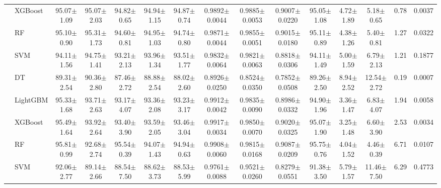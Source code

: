 \begin{tabular}{@{}llccccccccccccc@{}}
 & XGBoost & 95.07{\tiny$\pm$1.09} & 95.07{\tiny$\pm$2.03} & 94.82{\tiny$\pm$0.65} & 94.94{\tiny$\pm$1.15} & 94.87{\tiny$\pm$0.74} & 0.9892{\tiny$\pm$0.0044} & 0.9885{\tiny$\pm$0.0053} & 0.9007{\tiny$\pm$0.0220} & 95.05{\tiny$\pm$1.08} & 4.72{\tiny$\pm$1.89} & 5.18{\tiny$\pm$0.65} & 0.78 & 0.0037\\
 & RF & 95.10{\tiny$\pm$0.90} & 95.31{\tiny$\pm$1.73} & 94.60{\tiny$\pm$0.81} & 94.95{\tiny$\pm$1.03} & 94.74{\tiny$\pm$0.80} & 0.9871{\tiny$\pm$0.0044} & 0.9855{\tiny$\pm$0.0051} & 0.9015{\tiny$\pm$0.0180} & 95.11{\tiny$\pm$0.89} & 4.38{\tiny$\pm$1.26} & 5.40{\tiny$\pm$0.81} & 1.27 & 0.0322\\
 & SVM & 94.11{\tiny$\pm$1.56} & 94.75{\tiny$\pm$1.41} & 93.21{\tiny$\pm$2.13} & 93.96{\tiny$\pm$1.34} & 93.51{\tiny$\pm$1.77} & 0.9832{\tiny$\pm$0.0064} & 0.9821{\tiny$\pm$0.0063} & 0.8818{\tiny$\pm$0.0306} & 94.11{\tiny$\pm$1.49} & 5.00{\tiny$\pm$1.59} & 6.79{\tiny$\pm$2.13} & 1.21 & 0.1877\\
 & DT & 89.31{\tiny$\pm$2.54} & 90.36{\tiny$\pm$2.80} & 87.46{\tiny$\pm$2.72} & 88.88{\tiny$\pm$2.54} & 88.02{\tiny$\pm$2.60} & 0.8926{\tiny$\pm$0.0250} & 0.8524{\tiny$\pm$0.0350} & 0.7852{\tiny$\pm$0.0508} & 89.26{\tiny$\pm$2.50} & 8.94{\tiny$\pm$2.52} & 12.54{\tiny$\pm$2.72} & 0.19 & 0.0007\\
\midrule
{} & LightGBM & 95.33{\tiny$\pm$1.68} & 93.71{\tiny$\pm$2.63} & 93.17{\tiny$\pm$4.07} & 93.36{\tiny$\pm$2.08} & 93.23{\tiny$\pm$3.17} & 0.9912{\tiny$\pm$0.0042} & 0.9835{\tiny$\pm$0.0090} & 0.8986{\tiny$\pm$0.0332} & 94.90{\tiny$\pm$1.96} & 3.36{\tiny$\pm$1.47} & 6.83{\tiny$\pm$4.07} & 1.94 & 0.0058\\
 & XGBoost & 95.49{\tiny$\pm$1.64} & 93.92{\tiny$\pm$2.64} & 93.40{\tiny$\pm$3.90} & 93.59{\tiny$\pm$2.05} & 93.46{\tiny$\pm$3.04} & 0.9917{\tiny$\pm$0.0034} & 0.9850{\tiny$\pm$0.0070} & 0.9020{\tiny$\pm$0.0325} & 95.07{\tiny$\pm$1.90} & 3.25{\tiny$\pm$1.48} & 6.60{\tiny$\pm$3.90} & 2.53 & 0.0034\\
 & RF & 95.81{\tiny$\pm$0.99} & 92.68{\tiny$\pm$2.74} & 95.54{\tiny$\pm$0.39} & 94.07{\tiny$\pm$1.43} & 94.94{\tiny$\pm$0.63} & 0.9908{\tiny$\pm$0.0060} & 0.9815{\tiny$\pm$0.0168} & 0.9087{\tiny$\pm$0.0209} & 95.75{\tiny$\pm$0.76} & 4.04{\tiny$\pm$1.52} & 4.46{\tiny$\pm$0.39} & 6.71 & 0.0107\\
 & SVM & 92.06{\tiny$\pm$2.77} & 89.14{\tiny$\pm$2.66} & 88.54{\tiny$\pm$7.50} & 88.62{\tiny$\pm$3.73} & 88.53{\tiny$\pm$5.99} & 0.9761{\tiny$\pm$0.0088} & 0.9521{\tiny$\pm$0.0260} & 0.8279{\tiny$\pm$0.0551} & 91.38{\tiny$\pm$3.50} & 5.79{\tiny$\pm$1.57} & 11.46{\tiny$\pm$7.50} & 6.29 & 0.4773\\

\end{tabular}

